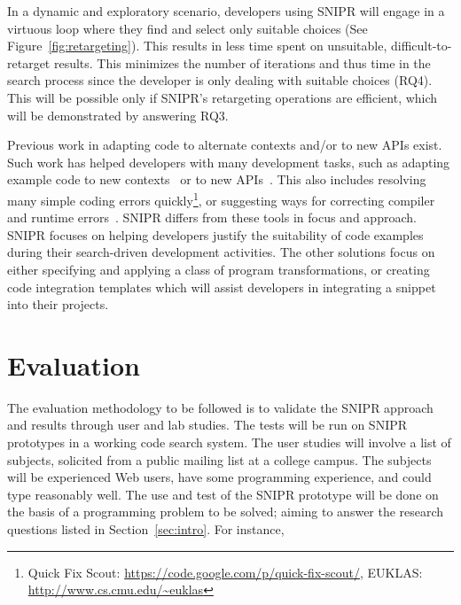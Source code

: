 \documentclass[conference]{IEEEtran}
\begin{document}
In a dynamic and exploratory scenario, developers using \uppercase{SNIPR} will engage in a virtuous loop where they find and select only suitable choices (See Figure~\ref{fig:retargeting}). This results in less time spent on unsuitable, difficult-to-retarget results. This minimizes the number of iterations and thus time in the search process since the developer is only dealing with suitable choices (RQ4). This will be possible only if \uppercase{SnipR}'s retargeting operations are efficient, which will be demonstrated by answering RQ3.

Previous work in adapting code to alternate contexts and/or to new APIs exist. Such work has helped developers with many development tasks, such as adapting example code to new contexts~\cite{Wightman:2012gc} or to new APIs~\cite{Nita:2010en}. This also includes resolving many simple coding errors quickly\footnote{{Quick Fix Scout: \url{https://code.google.com/p/quick-fix-scout/}}, {EUKLAS: \url{http://www.cs.cmu.edu/~euklas}}}, or suggesting ways for correcting compiler and runtime errors~\cite{Hartmann:2010hx}. \uppercase{SnipR} differs from these tools in focus and approach. \uppercase{SnipR} focuses on helping developers justify the suitability of code examples during their search-driven development activities. The other solutions focus on either specifying and applying a class of program transformations, or creating code integration templates which will assist developers in integrating a snippet into their projects. 

\section{Evaluation}
\label{sec:evaluate}

The evaluation methodology to be followed is to validate the \uppercase{SnipR} approach and results through user and lab studies. The tests will be run on \uppercase{SnipR} prototypes in a working code search system. The user studies will involve a list of subjects, solicited from a public mailing list at a college campus. The subjects will be experienced Web users, have some programming experience, and could type reasonably well. The use and test of the \uppercase{SnipR} prototype will be done on the basis of a programming problem to be solved; aiming to answer the research questions listed in Section~\ref{sec:intro}. For instance,
\end{document}
